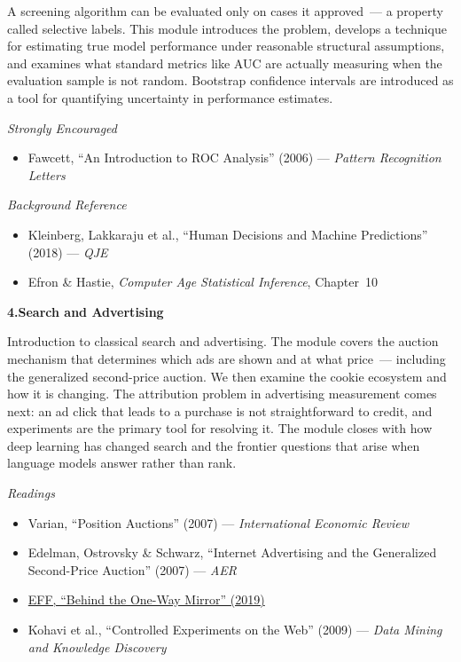 \documentclass[11pt]{article}
\newcommand{\module}[2]{%
  \vspace{10pt}%
  {\large\textbf{#1\quad #2}}%
  \vspace{4pt}%
  \newline%
}
\begin{document}
A screening algorithm can be evaluated only on cases it approved~--- a property called selective labels. This module introduces the problem, develops a technique for estimating true model performance under reasonable structural assumptions, and examines what standard metrics like AUC are actually measuring when the evaluation sample is not random. Bootstrap confidence intervals are introduced as a tool for quantifying uncertainty in performance estimates.

\smallskip
\textit{Strongly Encouraged}
\begin{itemize}
  \item Fawcett, ``An Introduction to ROC Analysis'' (2006) --- \textit{Pattern Recognition Letters}
\end{itemize}

\textit{Background Reference}
\begin{itemize}
  \item Kleinberg, Lakkaraju et al., ``Human Decisions and Machine Predictions'' (2018) --- \textit{QJE}
  \item Efron \& Hastie, \textit{Computer Age Statistical Inference}, Chapter~10
\end{itemize}

\bigskip

\module{4.}{Search and Advertising}

Introduction to classical search and advertising. The module covers the auction mechanism that determines which ads are shown and at what price~--- including the generalized second-price auction. We then examine the cookie ecosystem and how it is changing. The attribution problem in advertising measurement comes next: an ad click that leads to a purchase is not straightforward to credit, and experiments are the primary tool for resolving it. The module closes with how deep learning has changed search and the frontier questions that arise when language models answer rather than rank.

\smallskip
\textit{Readings}
\begin{itemize}
  \item Varian, ``Position Auctions'' (2007) --- \textit{International Economic Review}
  \item Edelman, Ostrovsky \& Schwarz, ``Internet Advertising and the Generalized Second-Price Auction'' (2007) --- \textit{AER}
  \item \href{https://www.eff.org/wp/behind-the-one-way-mirror}{EFF, ``Behind the One-Way Mirror'' (2019)}
  \item Kohavi et al., ``Controlled Experiments on the Web'' (2009) --- \textit{Data Mining and Knowledge Discovery}
\end{itemize}
\end{document}
